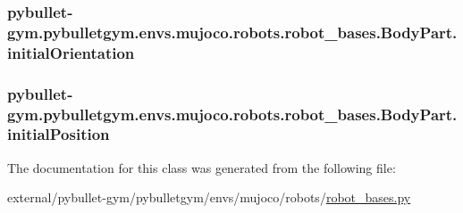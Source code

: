 \subsubsection[{\texorpdfstring{initial\+Orientation}{initialOrientation}}]{\setlength{\rightskip}{0pt plus 5cm}pybullet-\/gym.\+pybulletgym.\+envs.\+mujoco.\+robots.\+robot\+\_\+bases.\+Body\+Part.\+initial\+Orientation}\hypertarget{classpybullet-gym_1_1pybulletgym_1_1envs_1_1mujoco_1_1robots_1_1robot__bases_1_1_body_part_ab97b097d5336520cd79f83789e68f204}{}\label{classpybullet-gym_1_1pybulletgym_1_1envs_1_1mujoco_1_1robots_1_1robot__bases_1_1_body_part_ab97b097d5336520cd79f83789e68f204}
\subsubsection[{\texorpdfstring{initial\+Position}{initialPosition}}]{\setlength{\rightskip}{0pt plus 5cm}pybullet-\/gym.\+pybulletgym.\+envs.\+mujoco.\+robots.\+robot\+\_\+bases.\+Body\+Part.\+initial\+Position}\hypertarget{classpybullet-gym_1_1pybulletgym_1_1envs_1_1mujoco_1_1robots_1_1robot__bases_1_1_body_part_a85f8c805fa6a6e5af1378ecf9d6ad8f0}{}\label{classpybullet-gym_1_1pybulletgym_1_1envs_1_1mujoco_1_1robots_1_1robot__bases_1_1_body_part_a85f8c805fa6a6e5af1378ecf9d6ad8f0}


The documentation for this class was generated from the following file\+:\begin{DoxyCompactItemize}
\item 
external/pybullet-\/gym/pybulletgym/envs/mujoco/robots/\hyperlink{mujoco_2robots_2robot__bases_8py}{robot\+\_\+bases.\+py}\end{DoxyCompactItemize}
